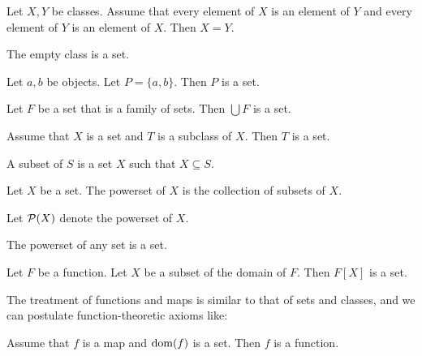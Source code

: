 \documentclass{article}
\begin{document}
\begin{forthel}
\begin{lemma}
    Let $X, Y$ be classes.
    Assume that every element of $X$ is an element of $Y$ and every element of
    $Y$ is an element of $X$.
    Then $X = Y$.
\end{lemma}

\begin{axiom}
The empty class is a set.
\end{axiom}

\begin{axiom}
Let $a,b$ be objects. Let $P = \{a,b\}$. Then $P$  is a set.
\end{axiom}

\begin{axiom}
Let $F$ be a set that is a family of sets. Then
$\bigcup F$ is a set.
\end{axiom}

\begin{axiom}
    Assume that $X$ is a set and $T$ is a subclass of $X$.
    Then $T$ is a set.
\end{axiom}

\begin{definition}
A subset of $S$ is a set $X$ such that $X \subseteq S$.
\end{definition}

\begin{definition}
      Let $X$ be a set.
      The powerset of $X$ is the collection of subsets of $X$.
\end{definition}

Let ${\cal P}(X)$ denote the powerset of $X$.

\begin{axiom}
  The powerset of any set is a set.
\end{axiom}

\begin{axiom}
Let $F$ be a function.    
Let $X$ be a subset of the domain of $F$.
Then $F[X]$ is a set.
\end{axiom}
\end{forthel}

The treatment of functions and maps is similar to that
of sets and classes, and we can postulate function-theoretic
axioms like:

\begin{forthel}
  \begin{axiom}
    Assume that $f$ is a map and $\operatorname{dom}(f)$ is a set.
    Then $f$ is a function.
  \end{axiom}
\end{forthel}
\end{document}
